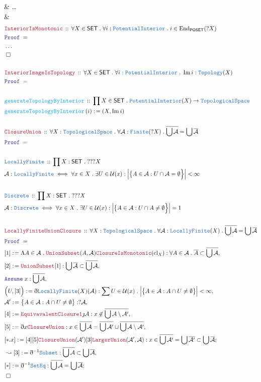 \documentclass[12pt]{scrartcl}
\newcommand{\TYPE}[1]{\textcolor{NavyBlue}{\mathtt{#1}}}
\newcommand{\FUNC}[1]{\textcolor{Cerulean}{\mathtt{#1}}}
\newcommand{\LOGIC}[1]{\textcolor{Blue}{\mathtt{#1}}}
\newcommand{\THM}[1]{\textcolor{Maroon}{\mathtt{#1}}}
\renewcommand{\.}{\; . \;}
\newcommand{\de}{: \kern 0.1pc =}
\newcommand{\Act}[1]{\left( #1 \right)}
\newcommand{\Theorem}[2]{& \THM{#1} \, :: \, #2 \\ & \Proof = \\ }
\newcommand{\DeclareType}[2]{& \TYPE{#1} \, :: \, #2 \\}
\newcommand{\DefineType}[3]{& #1 : \TYPE{#2} \iff #3 \\}
\newcommand{\DeclareFunc}[2]{& \FUNC{#1} \, :: \, #2 \\}
\newcommand{\DefineFunc}[3]{&  \FUNC{#1}\Act{#2} \de #3 \\}
\newcommand{\Page}[1]{ \begin{align*} #1 \end{align*}   }
\newcommand{ \bd }{ \ByDef }
\newcommand{\NoProof}{ & \ldots \\ \EndProof}
\DeclareMathOperator*{\im}{Im}
\newcommand{\End}{\mathrm{End}}
\newcommand{\Say}[3]{& #1 \de #2 : #3, \\}
\newcommand{\Conclude}[3]{& #1 \de #2 : #3; \\}
\newcommand{\Derive}[3]{& \leadsto #1 \de #2 : #3, \\}
\newcommand{\Assume}[2]{& \LOGIC{Assume} \; #1 : #2, \\}
\newcommand{\QED}{\; \square}
\newcommand{\EndProof}{& \QED \\}
\newcommand{\ByDef}{\eth}
\newcommand{\ByConstr}{\jmath}
\newcommand{\Proof}{\LOGIC{Proof} \; }
\newcommand{\A}{\mathcal{A}}
\newcommand{\SET}{\mathsf{SET}}
\newcommand{\TS}{\TYPE{TopologicalSpace}}
\newcommand{\LF}{\TYPE{LocallyFinite}}
\DeclareMathOperator*{\cl}{cl}
\renewcommand{\U}{\mathcal{U}}
\begin{document}
{{	}
	\NoProof
}\Page{
	\Theorem{InteriorIsMonotonic}{
		\forall X \in \SET \.
		\forall i : \TYPE{PotentialInterior} \.
		i \in \End_{\mathsf{POSET}}(?X)
	}
	\NoProof
	\\
	\Theorem{InteriorImageIsTopology}
	{
		\forall X \in \SET \.
		\forall i : \TYPE{PotentialInterior} \.
		\im i : \TYPE{Topology}(X)
	}
	\\
	\DeclareFunc{generateTopologyByInterior}
	{
		\prod X \in \SET \. 
		\TYPE{PotentialInterior}(X)
		\to \TS
	}
	\DefineFunc{generateTopologyByInterior}{i}
	{
		(X, \im i)
	}
	\\
	\Theorem{ClosureUnion}
	{
		\forall X : \TS \. 
		\forall \A : \TYPE{Finite}(?X) \.
		\overline{\bigcup \A} = \bigcup \overline{\A}
	}
	\\
	\DeclareType{LocallyFinite}
	{
		\prod X : \SET \. ???X
	}
	\DefineType{\A}{LocallyFinite}
	{
		\forall x \in X \. \exists U \in \U(x) :
		\Big|\big\{ A \in \A : U \cap \A = \emptyset  \Big\}\Big| < \infty 
	} 
	\\
	\DeclareType{Discrete}
	{
		\prod X : \SET \. ???X
	}
	\DefineType{\A}{Discrete}
	{
		\forall x \in X \. \exists U \in \U(x) : 
		\Big|\big\{ A \in \A : U \cap A \neq \emptyset  \Big\}\Big| = 1
	}
	\\
	\Theorem{LocallyFiniteUnionClosure}
	{
		\forall X : \TS \.
		\forall \A : \TYPE{LocallyFinite}(X) \.
		\overline{\bigcup \A} = \bigcup \overline{\A} 
	}
	\Say{[1]}{
		\Lambda A \in \A \. 
		\THM{UnionSubset}(A,\A)
		\THM{ClosureIsMonotonic}({\cl}_X)}
	{
		\forall A \in \A \. \overline{A} \subset \overline{\bigcup \A}
	}
	\Say{[2]}{ \THM{UnionSubset}[1] }
	{
		 \bigcup \overline{\A} \subset \overline{\bigcup \A} 
	}
	\Assume{x}{\overline{\bigcup \A}}
	\Say{ \Big( U, [3]\Big)}{\bd \LF(X)(\A)}
	{
		 \sum U \in \U(x) \. 
		\Big| \big\{ A \in \A :  A \cap U \neq \emptyset  \big\}\Big|  < \infty
	}
	\Say{\A'}{\big\{ A \in \A : A \cap U \neq \emptyset  \big\}}
	{ ?\A  }
	\Say{[4]}{\THM{EquivavalentClosure1}\ByConstr \A}
	{
		x \not\in \overline{\bigcup \A \setminus \A' }
	}
	\Say{[5]}{\bd x  \THM{ClosureUnion}}
	{ 
		x \in \overline{\bigcup \A} = 
		\overline{\bigcup \A'} \cup \overline{\bigcup \A \setminus \A'}
	}
	\Conclude{[*.x]}{[4][5] \THM{ClosureUnion}(\A')[3] \THM{LargerUnion}(\A',\A)  }
	{
		x \in \overline{\bigcup \A'} =
		\bigcup \overline{\A'} \subset \bigcup \overline{\A}
	}
	\Derive{[3]}{\bd^{-1}\TYPE{Subset}}
	{
		\overline{\bigcup \A} \subset \bigcup \overline{\A}
	}
	\Conclude{[*]}{\bd^{-1}\TYPE{SetEq}}
	{
		\overline{\bigcup \A} = \bigcup \overline{\A}
	}
	\EndProof
	\\
}
\end{document}
